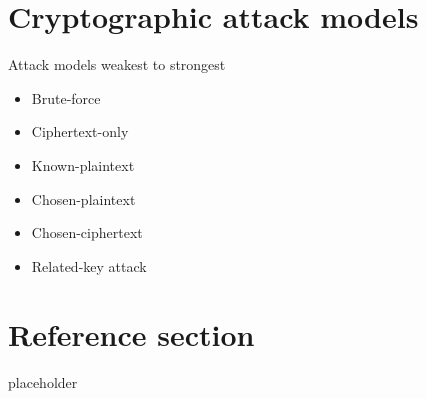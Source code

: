 \documentclass{article}
\begin{document}
\section{Cryptographic attack models}
\begin{flushleft}
Attack models weakest to strongest
\end{flushleft}
\begin{itemize}
  \item Brute-force 
  \item Ciphertext-only 
  \item Known-plaintext 
  \item Chosen-plaintext 
  \item Chosen-ciphertext 
  \item Related-key attack
\end{itemize}

\pagebreak
\section*{Reference section} \label{sec:reference}
\begin{description}
	\item[placeholder] \hfill \\
\end{description}
\end{document}
